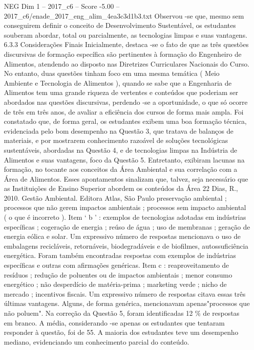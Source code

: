 \begin{textsample}{NEG Dim 1 – 2017\_c6 – Score -5.00 – 2017\_c6/enade\_2017\_eng\_alim\_4ea3c3d1b3.txt}
Observou -se que, mesmo sem conseguirem definir o conceito de Desenvolvimento Sustentável, os estudantes souberam abordar, total ou parcialmente, as tecnologias limpas e suas vantagens. 6.3.3 Considerações Finais Inicialmente, destaca -se o fato de que as três questões discursivas de formação específica são pertinentes à formação do Engenheiro de Alimentos, atendendo ao disposto nas Diretrizes Curriculares Nacionais do Curso.
No entanto, duas questões tinham foco em uma mesma temática ( Meio Ambiente e Tecnologia de Alimentos ), quando se sabe que a Engenharia de Alimentos tem uma grande riqueza de vertentes e conteúdos que poderiam ser abordados nas questões discursivas, perdendo -se a oportunidade, o que só ocorre de três em três anos, de avaliar a eficiência dos cursos de forma mais ampla.
Foi constatado que, de forma geral, os estudantes exibem uma boa formação técnica, evidenciada pelo bom desempenho na Questão 3, que tratava de balanços de materiais, e por mostrarem conhecimento razoável de soluções tecnológicas sustentáveis, abordadas na Questão 4, e de tecnologias limpas na Indústria de Alimentos e suas vantagens, foco da Questão 5.
Entretanto, exibiram lacunas na formação, no tocante aos conceitos da Área Ambiental e sua correlação com a Área de Alimentos.
Esses apontamentos sinalizam que, talvez, seja necessário que as Instituições de Ensino Superior abordem os conteúdos da Área 22 Dias, R., 2010.
Gestão Ambiental.
Editora Atlas, São Paulo preservação ambiental ; processos que não gerem impactos ambientais ; processos sem impacto ambiental ( o que é incorreto ).
Item ‘ b ’ : exemplos de tecnologias adotadas em indústrias específicas ; cogeração de energia ; reúso de água ; uso de membranas ; geração de energia eólica e solar.
Um expressivo número de respostas mencionava o uso de embalagens recicláveis, retornáveis, biodegradáveis e de biofilmes, autossuficiência energética.
Foram também encontradas respostas com exemplos de indústrias específicas e outras com afirmações genéricas.
Item c : reaproveitamento de resíduos ; redução de poluentes ou de impactos ambientais ; menor consumo energético ; não desperdício de matéria-prima ; marketing verde ; nicho de mercado ; incentivos fiscais.
Um expressivo número de respostas citava essas três últimas vantagens.
Alguns, de forma genérica, mencionavam apenas"processos que não poluem".
Na correção da Questão 5, foram identificadas 12 \% de respostas em branco.
A média, considerando -se apenas os estudantes que tentaram responder à questão, foi de 55.
A maioria dos estudantes teve um desempenho mediano, evidenciando um conhecimento parcial do conteúdo.

\end{textsample}
